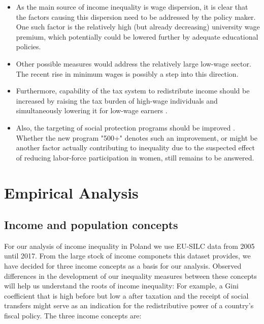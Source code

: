 \documentclass[a4paper]{article}\usepackage[]{graphicx}\usepackage[]{color}
\begin{document}
\begin{itemize}
    \item As the main source of income inequality is wage dispersion, it is clear that the factors causing this dispersion need to be addressed by the policy maker. One such factor is the relatively high (but already decreasing) university wage premium, which potentially could be lowered further by adequate educational policies.  
    \item Other possible measures would address the relatively large low-wage sector. The recent rise in minimum wages is possibly a step into this direction.
    \item Furthermore, capability of the tax system to redistribute income should be increased by raising the tax burden of high-wage individuals and simultaneously lowering it for low-wage earners \parencite{brzezinski2017}. 
    \item Also, the targeting of social protection programs should be improved \parencite{Muszynska2018}. Whether the new program "500+" denotes such an improvement, or might be another factor actually contributing to inequality due to the suspected effect of reducing labor-force participation in women, still remains to be answered. 
\end{itemize}


\section{Empirical Analysis}
\label{silc}

\subsection{Income and population concepts}
For our analysis of income inequality in Poland we use EU-SILC data from 2005 until 2017. From the large stock of income componets this dataset provides, we have decided for three income concepts as a basis for our analysis. Observed differences in the development of our inequality measures between these concepts will help us understand the roots of income inequality: For example, a Gini coefficient that is high before but low a after taxation and the receipt of social transfers might serve as an indication for the redistributive power of a country's fiscal policy. The three income concepts are:
\end{document}
